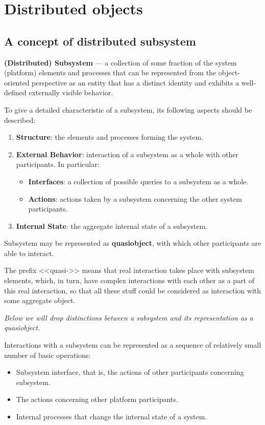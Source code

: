 ﻿\section{Distributed objects}
\subsection{A concept of distributed subsystem}

\textbf{(Distributed) Subsystem} --- a collection of some fraction of the system (platform) elements and processes that can be represented from the object-oriented perspective as an entity that has a distinct identity and exhibits a well-defined externally visible behavior.

To give a detailed characteristic of a subsystem, its following aspects should be described:
\begin{enumerate}
\item \textbf{Structure}: the elements and processes forming the system.
\item \textbf{External Behavior}: interaction of a subsystem as a whole with other participants. In particular: \begin{itemize}
    \item \textbf{Interfaces}: a collection of possible queries to a subsystem as a whole.
    \item \textbf{Actions}: actions taken by a subsystem concerning the other system participants.
  \end{itemize}
\item \textbf{Internal State}: the aggregate internal state of a subsystem.
\end{enumerate}

Subsystem may be represented as \textbf{quasiobject}, with which other participants are able to interact.

\begin{note}
  The prefix <<quasi->> means that real interaction takes place with subsystem elements, which, in turn, have complex interactions with each other as a part of this real interaction, so that all these stuff could be considered as interaction with some aggregate object.
\end{note}

\begin{note} \it
Below we will drop distinctions between a subsystem and its representation as a quasiobject.
\end{note}

Interactions with a subsystem can be represented as a sequence of relatively small number of basic operations:
\begin{itemize}
  \item Subsystem interface, that is, the actions of other participants concerning subsystem.
  \item The actions concerning other platform participants.
  \item Internal processes that change the internal state of a system.
\end{itemize}

